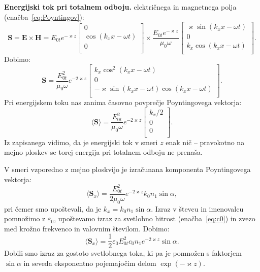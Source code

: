 \begin{example}{\bf Energijski tok pri totalnem odboju.}
električnega in magnetnega polja (enačba~\ref{eq:Poyntingov}):
\begin{equation}
\mathbf{S} = \mathbf{E} \times \mathbf{H} = 
E_{0t}e^{-\varkappa z} \left[ \begin{array}{c}
                        0\\
                        \cos(k_xx-\omega t)\\
                        0 \\
                       \end{array}\right]
\times
\frac{E_{0t}e^{-\varkappa z}}{\mu_0\omega}\left[
\begin{array}{c}
\varkappa \sin \left(k_xx-\omega t\right)\\
0\\
k_x \cos \left(k_xx-\omega t\right) \\
\end{array}
\right]\!\!.
\label{eq:04_76}
\end{equation}
Dobimo:
\begin{equation}
\mathbf{S} 
= \frac{E_{0t}^2}{\mu_0\omega}e^{-2\varkappa z}\left[
\begin{array}{c}
k_x\cos^2 \left(k_xx-\omega t\right)\\
0\\
-\varkappa \sin \left(k_xx-\omega t\right) \cos \left(k_xx-\omega t\right)\\
\end{array}
\right]\!\!.
\label{eq:04_77}
\end{equation}
Pri energijskem toku nas zanima časovno povprečje Poyntingovega vektorja:
\begin{equation}
\langle \mathbf{S}\rangle = \frac{E_{0t}^2}{\mu_0\omega}e^{-2\varkappa z}\left[
\begin{array}{c}
k_x/2\\
0\\
0\\
\end{array}
\right]\!\!.
\label{eq:04_78}
\end{equation}
Iz zapisanega vidimo, da je energijski tok v smeri $z$ enak nič -- pravokotno na mejno 
ploskev se torej energija pri totalnem odboju ne prenaša. 

V smeri vzporedno z mejno ploskvijo je izračunana komponenta Poyntingovega vektorja:
\begin{equation}
\langle \mathbf{S}_x\rangle = \frac{E_{0t}^2}{2\mu_0\omega}e^{-2\varkappa z}k_0 n_1\sin \alpha,
\label{eq:04_79}
\end{equation}
pri čemer smo upoštevali, da je $k_x = k_0 n_1 \sin \alpha$. Izraz v števcu in imenovalcu pomnožimo 
z $\varepsilon_0$, upoštevamo izraz za svetlobno hitrost (enačba~\ref{eq:c0}) in zvezo med krožno frekvenco
in valovnim številom. Dobimo:
\begin{equation}
\langle \mathbf{S}_x\rangle = \frac{1}{2}\varepsilon_0 E_{0t}^2 c_0 n_1  e^{-2\varkappa z} \sin \alpha.
\label{eq:04_80}
\end{equation}
Dobili smo izraz za gostoto svetlobnega toka, ki pa je pomnožen s faktorjem $\sin \alpha$ in seveda eksponentno
pojemajočim delom $\exp(-\varkappa z)$.


\end{example}
